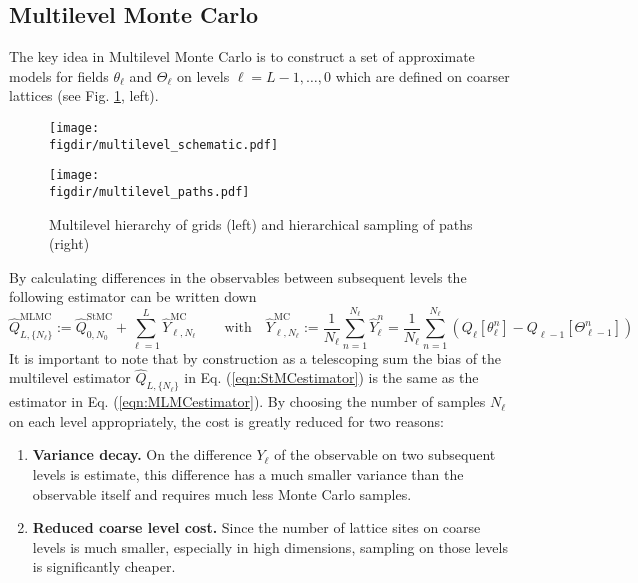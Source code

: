 \documentclass[11pt]{article}
\newcommand{\figdir}{./figures/}
\begin{document}
\subsection{Multilevel Monte Carlo}
The key idea in Multilevel Monte Carlo is to construct a set of approximate models for fields $\theta_\ell$ and $\Theta_\ell$ on levels $\ell=L-1,\dots,0$ which are defined on coarser lattices (see Fig. \ref{fig:multilevel}, left).
\begin{figure}
  \begin{center}
  \begin{minipage}{0.55\linewidth}
    \texttt{[image: \\figdir/multilevel\_schematic.pdf]}
  \end{minipage}
  \hfill
  \begin{minipage}{0.4\linewidth}
    \texttt{[image: \\figdir/multilevel\_paths.pdf]}
  \end{minipage}
  \caption{Multilevel hierarchy of grids (left) and hierarchical sampling of paths (right)}\label{fig:multilevel}
  \end{center}
\end{figure}
By calculating differences in the observables between subsequent levels the following estimator can be written down
\begin{equation}
  \hat{Q}_{L,\{N_\ell\}}^{\text{MLMC}} := \hat{Q}_{0,N_0}^{\text{StMC}} + \sum_{\ell=1}^L \hat{Y}_{\ell,N_\ell}^{\text{MC}}\qquad\text{with}\quad
  \hat{Y}_{\ell,N_\ell}^{\text{MC}} := \frac{1}{N_\ell}\sum_{n=1}^{N_\ell} \hat{Y}_\ell^n = \frac{1}{N_\ell}\sum_{n=1}^{N_\ell} \left(Q_\ell[\theta_\ell^n] - Q_{\ell-1}[\Theta_{\ell-1}^n]\right)\label{eqn:MLMCestimator}
\end{equation}
It is important to note that by construction as a telescoping sum the bias of the multilevel estimator $\hat{Q}_{L,\{N_\ell\}}$ in Eq. (\ref{eqn:StMCestimator}) is the same as the estimator in Eq. (\ref{eqn:MLMCestimator}). By choosing the number of samples $N_\ell$ on each level appropriately, the cost is greatly reduced for two reasons:
\begin{enumerate}
\item \textbf{Variance decay.} On the difference $Y_\ell$ of the observable on two subsequent levels is estimate, this difference has a much smaller variance than the observable itself and requires much less Monte Carlo samples. 
  \item \textbf{Reduced coarse level cost.} Since the number of lattice sites on coarse levels is much smaller, especially in high dimensions, sampling on those levels is significantly cheaper.
\end{enumerate}
\end{document}
